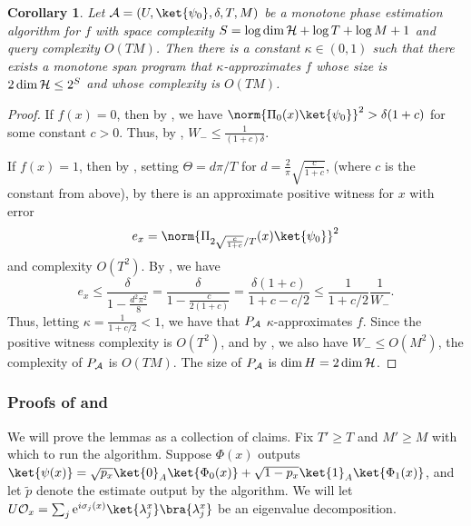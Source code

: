 \documentclass[11pt]{article}
\numberwithin{equation}{section}
\newtheorem{corollary}[theorem]{Corollary}
\theoremstyle{definition}
\theoremstyle{plain}
\newcommand{\eee}{\mathrm e}
\begin{document}
\begin{corollary}
Let ${\cal A}=(U,\ket{\psi_0},\delta,T,M)$ be a monotone phase estimation algorithm for $f$ with space complexity $S=\log \dim {\cal H}+\log T+\log M+1$ and query complexity $O(TM)$. Then there is a constant $\kappa\in(0,1)$ such that there exists a monotone span program that $\kappa$-approximates $f$ whose size is $2\dim{\cal H}\leq 2^S$ and whose complexity is $O(TM)$.
\end{corollary}
\begin{proof}
If $f(x)=0$, then by , we have $\norm{\Pi_0(x)\ket{\psi_0}}^2 > \delta(1+c)$ for some constant $c>0$. Thus, by , $W_-\leq \frac{1}{(1+c)\delta}$. 

If $f(x)=1$, then by , setting $\Theta=d\pi/T$ for $d=\frac{2}{\pi}\sqrt{\frac{c}{1+c}}$, (where $c$ is the constant from above), by  there is an approximate positive witness for $x$ with error 
$$e_x=\norm{\Pi_{2\sqrt{\frac{c}{1+c}}/T}(x)\ket{\psi_0}}^2$$
and complexity $O(T^2)$. By , we have
$$e_x\leq \frac{\delta}{1-\frac{d^2\pi^2}{8}} = \frac{\delta}{1-\frac{c}{2(1+c)}}=\frac{\delta(1+c)}{1+c - c/2}\leq \frac{1}{1+c/2}\frac{1}{W_-}.$$
Thus, letting $\kappa=\frac{1}{1+c/2}<1$, we have that $P_{\cal A}$ $\kappa$-approximates $f$. Since the positive witness complexity is $O(T^2)$, and by , we also have $W_-\leq O(M^2)$, the complexity of $P_{\cal A}$ is $O(TM)$. The size of $P_{\cal A}$ is $\dim H=2\dim{\cal H}$.
\end{proof}

%

\subsubsection{Proofs of  and }
\label{sec:monotone-phase-alg-proofs}

We will prove the lemmas as a collection of claims. Fix $T'\geq T$ and $M'\geq M$ with which to run the algorithm. Suppose $\Phi(x)$ outputs $\ket{\psi(x)}=\sqrt{p_x}\ket{0}_A\ket{\Phi_0(x)}+\sqrt{1-p_x}\ket{1}_A\ket{\Phi_1(x)}$, and let $\tilde p$ denote the estimate output by the algorithm. We will let $U{\cal O}_x=\sum_j \eee^{i\sigma_j(x)}\ket{\lambda_j^x}\bra{\lambda_j^x}$ be an eigenvalue decomposition.
\end{document}
